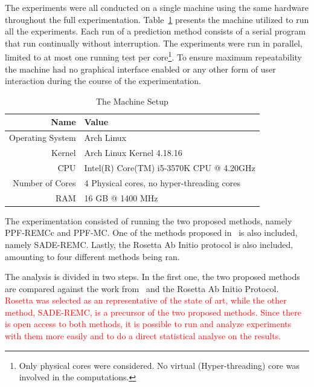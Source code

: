 The experiments were all conducted on a single machine using the same hardware
throughout the full experimentation. Table~\ref{tab:machine-setup}
presents the machine utilized to run all the experiments. Each run of a
prediction method consists of a serial program that run continually without
interruption. The experiments were run in parallel, limited to at most one
running test per core\footnote{Only physical cores were considered. No virtual
(Hyper-threading) core was involved in the computations.}. To ensure maximum
repeatability the machine had no graphical interface enabled or any other form
of user interaction during the course of the experimentation.

\begin{table}[th]
    \centering
    \begin{tabular}{r|l} \hline \hline
        Name & Value \\ \hline \hline
        Operating System & Arch Linux \\ \hline
        Kernel &  Arch Linux Kernel 4.18.16 \\ \hline
        CPU & Intel(R) Core(TM) i5-3570K CPU @ 4.20GHz \\ \hline
        Number of Cores & 4 Physical cores, no hyper-threading cores \\ \hline
        RAM & 16 GB @ 1400 MHz \\ \hline \hline
    \end{tabular}
    \caption{The Machine Setup}
    \label{tab:machine-setup}
\end{table}

The experimentation consisted of running the two proposed methods, namely
PPF-REMCc and PPF-MC. One of the methods proposed
in~\cite{silva2019self} is also included, namely SADE-REMC.
Lastly, the Rosetta Ab Initio protocol is also included, amounting to four
different methods being ran.

The analysis is divided in two steps. In the first one, the two proposed methods
are compared against the work from~ and the Rosetta Ab Initio
Protocol.
\textcolor{red}{Rosetta was selected as an representative of the state of art,
while the other method, SADE-REMC, is a precursor of the two proposed methods.
Since there is open
access to both methods, it is possible to run and analyze experiments with them
more easily and to do a direct statistical analyse on the results.
}

